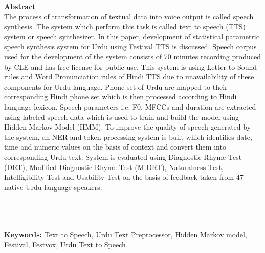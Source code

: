 
{\LARGE\textbf {Abstract}} \\ %

The process of transformation of textual data into voice output is called speech synthesis. The system which perform this task is called text to speech (TTS) system or speech synthesizer. In this paper, development of statistical parametric speech synthesis system for Urdu using Festival TTS is discussed. Speech corpus used for the development of the system consists of 70 minutes recording produced by CLE and has free license for public use. This system is using Letter to Sound rules and Word Pronunciation rules of Hindi TTS due to unavailability of these components for Urdu language. Phone set of Urdu are mapped to their corresponding Hindi phone set which is then processed according to Hindi language lexicon. Speech parameters i.e. F0, MFCCs and duration are extracted using labeled speech data which is used to train and build the model using Hidden Markov Model (HMM). To improve the quality of speech generated by the system, an NER and token processing system is built which identifies date, time and numeric values on the basis of context and convert them into corresponding Urdu text. System is evaluated using Diagnostic Rhyme Test (DRT), Modified Diagnostic Rhyme Test (M-DRT), Naturalness Test, Intelligibility Test and Usability Test on the basis of feedback taken from 47 native Urdu language speakers.

\\ \\ \\
\textbf{Keywords:}
Text to Speech, Urdu Text Preprocessor, Hidden Markov model, Festival, Festvox, Urdu Text to Speech
